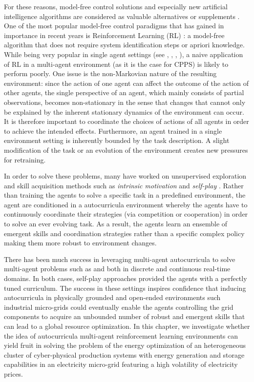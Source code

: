 For these reasons, model-free control solutions and especially new artificial intelligence algorithms are considered as valuable alternatives or supplements \cite{Gholian7236921}. One of the most popular model-free control paradigms that has gained in importance in recent years is Reinforcement Learning (RL) \cite{Sutton9780262039246, bakakeu2018}: a model-free algorithm that does not require system identification steps or apriori knowledge. While being very popular in single agent settings (see \cite{mnih2013playing}, \cite{openai2019solving}, \cite{hausknecht2015deep}, \cite{schulman2017proximal}), a naive application of RL in a multi-agent environment  (as it is the case for CPPS) is likely to perform poorly. One issue is the non-Markovian nature of the resulting environment: since the action of one agent can affect the outcome of the action of other agents, the single perspective of an agent, which mainly consists of partial observations, becomes non-stationary in the sense that changes that cannot only be explained by the inherent stationary dynamics of the environment can occur. It is therefore important to coordinate the choices of actions of all agents in order to achieve the intended effects. Furthermore, an agent trained in a single environment setting is inherently bounded by the task description. A slight modification of the task or an evolution of the environment creates new pressures for retraining.

In order to solve these problems, many have worked on unsupervised exploration and skill acquisition methods such as \textit{intrinsic motivation}\cite{Aubret2019ASO} and \textit{self-play} \cite{bansal2017emergent, Bai2020ProvableSA, TesauroBF00992697}. Rather than training the agents to solve a specific task in a predefined environment, the agent are conditioned in a autocurricula environment whereby the agents have to continuously coordinate their strategies (via competition or cooperation) in order to solve an ever evolving task. As a result, the agents learn an ensemble of emergent skills and coordination strategies rather than a specific complex policy making them more robust to environment changes.

There has been much success in leveraging multi-agent autocurricula to solve multi-agent problems such as \cite{lowe2017multiagent} and \cite{bansal2017emergent} both in discrete and continuous real-time domains. In both cases, self-play approaches provided the agents with a perfectly tuned curriculum. The success in these settings inspires confidence that inducing autocurricula in physically grounded and open-ended environments such industrial micro-grids could eventually enable the agents controlling the grid components to acquire an unbounded number of robust and emergent skills that can lead to a global resource optimization. In this chapter, we investigate whether the idea of autocurricula multi-agent reinforcement learning environments can yield fruit in solving the problem of the energy optimization of an heterogeneous cluster of cyber-physical production systems with energy generation and storage capabilities in an electricity micro-grid featuring a high volatility of electricity prices.

